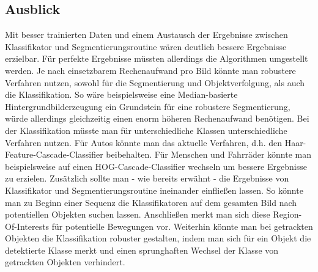 \documentclass[conference]{IEEEtran}
\begin{document}
\subsection{Ausblick}
Mit besser trainierten Daten und einem Austausch der Ergebnisse zwischen Klassifikator und Segmentierungsroutine wären deutlich bessere Ergebnisse erzielbar.
Für perfekte Ergebnisse müssten allerdings die Algorithmen umgestellt werden. Je nach einsetzbarem Rechenaufwand pro Bild könnte man robustere Verfahren nutzen, sowohl für die Segmentierung und Objektverfolgung, als auch die Klassifikation. So wäre beispielsweise eine Median-basierte Hintergrundbilderzeugung ein Grundstein für eine robustere Segmentierung, würde allerdings gleichzeitig einen enorm höheren Rechenaufwand benötigen.
Bei der Klassifikation müsste man für unterschiedliche Klassen unterschiedliche Verfahren nutzen. Für Autos könnte man das aktuelle Verfahren, d.h. den Haar-Feature-Cascade-Classifier beibehalten. Für Menschen und Fahrräder könnte man beispielsweise auf einen HOG-Cascade-Classifier wechseln um bessere Ergebnisse zu erzielen.
Zusätzlich sollte man - wie bereits erwähnt - die Ergebnisse von Klassifikator und Segmentierungsroutine ineinander einfließen lassen. So könnte man zu Beginn einer Sequenz die Klassifikatoren auf dem gesamten Bild nach potentiellen Objekten suchen lassen. Anschließen merkt man sich diese Region-Of-Interests für potentielle Bewegungen vor. Weiterhin könnte man bei getrackten Objekten die Klassifikation robuster gestalten, indem man sich für ein Objekt die detektierte Klasse merkt und einen sprunghaften Wechsel der Klasse von getrackten Objekten verhindert.











\end{document}
